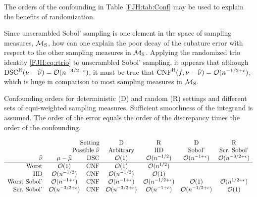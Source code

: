 \documentclass[graybox,footinfo]{svmult}
\DeclareMathOperator{\algn}{CNF}
\DeclareMathOperator{\disc}{DSC}
\begin{document}
The orders of the confounding in Table \ref{FJH:tab:Conf} may be used to explain the 
benefits of randomization.  

Since unscrambled Sobol' sampling is one element in the space of sampling measures,
${\mathcal{M}}_{\textup{S}}$, how can one explain the poor decay of the cubature error with 
respect to the other sampling measures  in  ${\mathcal{M}}_{\textup{S}}$.  Applying the 
randomized trio identity \eqref{FJH:eq:rtrio} to  unscrambled 
Sobol' sampling, it appears that although $\disc^\Rn(\nu - \hnu) = \Order(n^{-3/2+ 
\epsilon})$, it must be true that  $\algn^\Rn(f,\nu - \hnu) = \Order(n^{-1/2 + \epsilon})$, 
which is huge  in comparison to most sampling measures in
${\mathcal{M}}_{\textup{S}}$. 

\begin{table}
	\caption{Confounding orders for deterministic (D) and random (R) settings and 
	different sets of equi-weighted 
	sampling measures. Sufficient smoothness of the integrand is assumed.
	The order of the error equals the order of the discrepancy times the 
	order of the confounding. \label{FJH:tab:Conf}}
\begin{equation*}
\begin{array}{r@{\quad }c@{\quad }r@{\quad}c@{\quad}c@{\quad}c@{\quad}c}
\multicolumn{3}{r@{\quad}}{\text{Setting}}  & \Dt & \Rn & \Dt & \Rn\\
\multicolumn{3}{r@{\quad}}{\text{Possible }\hnu} & \textup{Arbitrary} & \textup{IID} & 
\textup{Sobol'}&  \textup{Scr.\ Sobol'}\\
 \hnu & \mu - \hmu & \disc& \Order(1) & \Order(n^{-1/2}) & 
\Order(n^{-1+\epsilon}) & 
\Order(n^{-3/2+\epsilon})\\
\hline 
\textup{Worst} & \Order(1) & \algn & \Order(1) & \Order(n^{1/2}) & \\
\textup{IID} & \Order(n^{-1/2}) & \algn & \Order(n^{-1/2}) & \Order(1) & \\
\textup{Worst Sobol'}& \Order(n^{-1+\epsilon}) & \algn & \Order(n^{-1+\epsilon}) & 
\Order(n^{-1/2+\epsilon}) & \Order(1) 
&\Order(n^{1/2+\epsilon})\\
\textup{Scr.\ Sobol'} &\Order(n^{-3/2+\epsilon}) & \algn 
&\Order(n^{-3/2+\epsilon})&\Order(n^{-1+\epsilon})&\Order(n^{-1/2+\epsilon})&\Order(1) 
\\
\end{array}
\end{equation*}
\end{table}



\begin{FJHLesson}
\FJHLessonThree
\end{FJHLesson}
\end{document}
